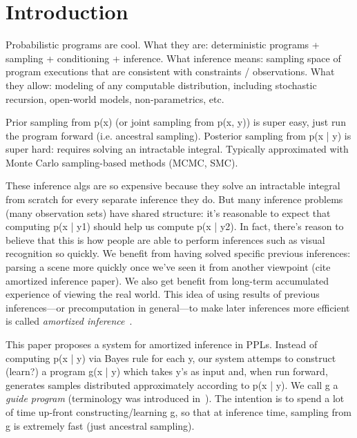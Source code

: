 \section{Introduction}
\label{sec:introduction}


Probabilistic programs are cool.
What they are: deterministic programs + sampling + conditioning + inference.
What inference means: sampling space of program executions that are consistent with constraints / observations.
What they allow: modeling of any computable distribution, including stochastic recursion, open-world models, non-parametrics, etc.~


Prior sampling from p(x) (or joint sampling from p(x, y)) is super easy, just run the program forward (i.e. ancestral sampling).
Posterior sampling from p(x | y) is super hard: requires solving an intractable integral.
Typically approximated with Monte Carlo sampling-based methods (MCMC, SMC).


These inference algs are so expensive because they solve an intractable integral from scratch for every separate inference they do.
But many inference problems (many observation sets) have shared structure: it's reasonable to expect that computing p(x | y1) should help us compute p(x | y2).
In fact, there's reason to believe that this is how people are able to perform inferences such as visual recognition so quickly.
We benefit from having solved specific previous inferences: parsing a scene more quickly once we've seen it from another viewpoint (cite amortized inference paper).
We also get benefit from long-term accumulated experience of viewing the real world.
This idea of using results of previous inferences---or precomputation in general---to make later inferences more efficient is called \emph{amortized inference}~\cite{AmortizedInference,StochasticInverses}.


This paper proposes a system for amortized inference in PPLs.
Instead of computing p(x | y) via Bayes rule for each y, our system attemps to construct (learn?) a program g(x | y) which takes y's as input and, when run forward, generates samples distributed approximately according to p(x | y).
We call g a \emph{guide program} (terminology was introduced in~\cite{GuidePrograms}).
The intention is to spend a lot of time up-front constructing/learning g, so that at inference time, sampling from g is extremely fast (just ancestral sampling).

